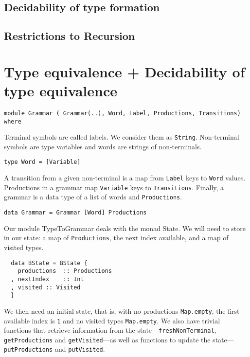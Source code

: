 \subsection{Decidability of type formation}
\subsection{Restrictions to Recursion}

\section{Type equivalence + Decidability of type equivalence}
\begin{lstlisting}
module Grammar ( Grammar(..), Word, Label, Productions, Transitions) where
\end{lstlisting}

Terminal symbols are called labels. We consider them as \lstinline|String|. Non-terminal symbols are type variables and words are strings of non-terminals. 
\begin{lstlisting}
type Word = [Variable]
\end{lstlisting}
A transition from a given non-terminal is a map from \lstinline|Label| keys to \lstinline|Word| values. Productions in a grammar map \lstinline|Variable| keys to \lstinline|Transitions|. Finally, a grammar is a data type of a list of words and \lstinline|Productions|.

\begin{lstlisting}
data Grammar = Grammar [Word] Productions 
\end{lstlisting}

Our module TypeToGrammar deals with the monad State. 
We will need to store in our state: a map of \lstinline|Productions|, the next index available, and a map of visited types.
\begin{lstlisting}
  data BState = BState {
    productions  :: Productions
  , nextIndex    :: Int
  , visited :: Visited
  }
\end{lstlisting}

We then need an initial state, that is, with no productions \lstinline|Map.empty|, the first available index is \lstinline|1| and no visited types \lstinline|Map.empty|. We also have trivial functions that retrieve information from the state---\lstinline|freshNonTerminal|, \lstinline|getProductions| and \lstinline|getVisited|---as well as functions to update the state---\lstinline|putProductions| and \lstinline|putVisited|.


